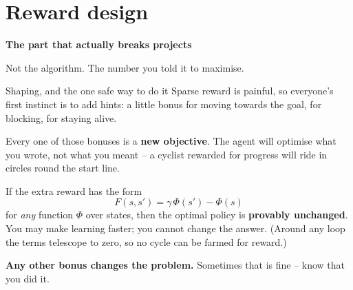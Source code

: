 \documentclass[aspectratio=169]{beamer}
\begin{document}
\section{Reward design}
\begin{frame}[plain]
  \begin{center}
    \vskip 1.6cm
    {\Huge\bfseries\color{popblue}The part that actually breaks projects}

    \vskip 0.6cm
    {\large Not the algorithm. The number you told it to maximise.}
  \end{center}
\end{frame}

\begin{frame}{Shaping, and the one safe way to do it}
  \small
  Sparse reward is painful, so everyone's first instinct is to add hints: a little bonus for
  moving towards the goal, for blocking, for staying alive.

  \vskip 6pt
  \begin{tcolorbox}[colback=armred!8, colframe=armred, boxrule=0.6pt, arc=2pt]
    \small
    Every one of those bonuses is a \textbf{new objective}. The agent will optimise what you
    wrote, not what you meant -- a cyclist rewarded for progress will ride in circles round
    the start line.
  \end{tcolorbox}

  \vskip 6pt
  \begin{tcolorbox}[colback=paramgreen!8, colframe=paramgreen, boxrule=0.7pt, arc=2pt,
                    title={\textbf{Potential-based shaping} (Ng, Harada \& Russell, 1999)}]
    \small
    If the extra reward has the form
    \[ F(s, s') = \gamma\, \Phi(s') - \Phi(s) \]
    for \emph{any} function $\Phi$ over states, then the optimal policy is \textbf{provably
    unchanged}. You may make learning faster; you cannot change the answer. (Around any loop the
    terms telescope to zero, so no cycle can be farmed for reward.)
  \end{tcolorbox}

  \vskip 3pt
  \begin{center}
    \footnotesize
    \textbf{Any other bonus changes the problem.} Sometimes that is fine -- know that you did it.
  \end{center}
\end{frame}
\end{document}
